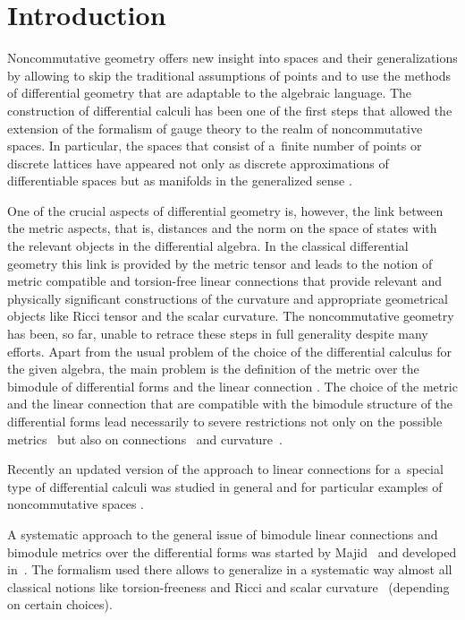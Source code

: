 \documentclass[pdftex]{sigma}
\numberwithin{equation}{section}
\begin{document}
\renewcommand{\thefootnote}{\arabic{footnote}}
\setcounter{footnote}{0}

\section{Introduction}

Noncommutative geometry \cite{BM_book,Connes:1994bk, La:bk} offers new insight into spaces and their generalizations
by allowing to skip the traditional assumptions of points and to use the methods of differential geometry that are
adaptable to the algebraic language. The construction of differential calculi has been one of the first steps that allowed
the extension of the formalism of gauge theory to the realm of noncommutative spaces. In particular, the spaces that consist
of a~finite number of points or discrete lattices have appeared not only as discrete approximations of differentiable spaces
but as manifolds in the generalized sense \cite{Balachandran:1996, BHDS, DMH}.

One of the crucial aspects of differential geometry is, however, the link between
the metric aspects, that is, distances and the norm on the space of states with the
relevant objects in the differential algebra. In the classical differential geometry this link
is provided by the metric tensor and leads to the notion of metric compatible and
torsion-free linear connections that provide relevant and physically significant constructions
of the curvature and appropriate geometrical objects like Ricci tensor and the scalar curvature.
The noncommutative geometry has been, so far, unable to retrace these steps
in full generality despite many efforts. Apart from the usual problem of the choice of
the differential calculus for the given algebra, the main problem is the definition of
the metric over the bimodule of differential forms and the linear connection \cite{MMM,mourad}.
The choice of the metric and the linear connection that are compatible with the bimodule structure
of the differential forms lead necessarily to severe restrictions not only on the possible
metrics~\cite{Si94} but also on connections~\cite{DM94} and curvature~\cite{DMM96}.

Recently an updated version of the approach to linear connections for a~special type of
differential calculi was studied in general and for particular examples of noncommutative
spaces \cite{BGJ, BGL, BGL2, BGM}.

A systematic approach to the general issue of bimodule linear connections and bimodule
metrics over the differential forms was started by Majid~\cite{BM11,majid2} and developed
in~\cite{BM14}. The formalism used there allows to generalize in a systematic way almost
all classical notions like torsion-freeness and Ricci and scalar curvature~\cite{BM_book}
(depending on certain choices).
\end{document}
